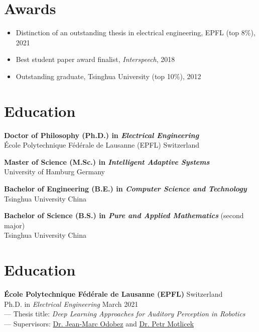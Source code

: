 \documentclass[a4paper,9pt]{extarticle} %
\newcommand{\ind}{\hspace*{1em}}
\begin{document}

\section{Awards}

\begin{itemize}[itemsep=-.9em]
  \item Distinction of an outstanding thesis in electrical engineering, EPFL (top 8\%), 2021
  \item Best student paper award finalist, \textit{Interspeech}, 2018
  \item Outstanding graduate, Tsinghua University (top 10\%), 2012
\end{itemize}


\section{Education}
\parbox{\textwidth}{%
\textbf{Doctor of Philosophy (Ph.D.) in \textit{Electrical Engineering}} \\
\ind{} \'Ecole Polytechnique F\'ed\'erale de Lausanne (EPFL) \hfill Switzerland
}

\parbox{\textwidth}{%
\textbf{Master of Science (M.Sc.) in \textit{Intelligent Adaptive Systems}} \\
\ind{} University of Hamburg \hfill Germany
}

\parbox{\textwidth}{%
\textbf{Bachelor of Engineering (B.E.) in \textit{Computer Science and Technology}} \\
\ind{} Tsinghua University \hfill China
}

\parbox{\textwidth}{%
\textbf{Bachelor of Science (B.S.) in \textit{Pure and Applied Mathematics}} (second major) \\
\ind{} Tsinghua University \hfill China
}

\iffalse{}


\section{Education}
\parbox{\textwidth}{%
\textbf{\'Ecole Polytechnique F\'ed\'erale de Lausanne (EPFL)} \hfill Switzerland \\
\ind{} Ph.D. in \textit{Electrical Engineering} \hfill March 2021 \\
\ind{} --- Thesis title: \textit{Deep Learning Approaches for Auditory Perception in Robotics} \\
\ind{} --- Supervisors: \href{https://idiap.ch/~odobez}{Dr. Jean-Marc Odobez} and \href{https://people.idiap.ch/pmotlic}{Dr. Petr Motlicek}
}
\end{document}
